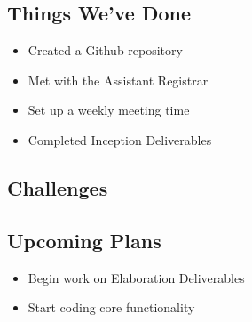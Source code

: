 \documentclass[11pt]{article}
\begin{document}
\subsection{Things We've Done}
\begin{itemize}
\item Created a Github repository
\item Met with the Assistant Registrar
\item Set up a weekly meeting time
\item Completed Inception Deliverables
\end{itemize}

\subsection{Challenges} %

\subsection{Upcoming Plans}
\begin{itemize}
\item Begin work on Elaboration Deliverables
\item Start coding core functionality
\end{itemize}
\end{document}
